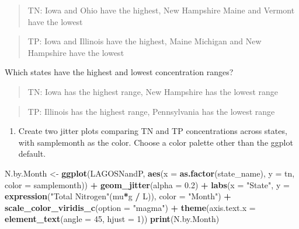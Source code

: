 \documentclass[]{article}
\newenvironment{Shaded}{\begin{snugshade}}{\end{snugshade}}
\newcommand{\DataTypeTok}[1]{\textcolor[rgb]{0.13,0.29,0.53}{#1}}
\newcommand{\DecValTok}[1]{\textcolor[rgb]{0.00,0.00,0.81}{#1}}
\newcommand{\FloatTok}[1]{\textcolor[rgb]{0.00,0.00,0.81}{#1}}
\newcommand{\KeywordTok}[1]{\textcolor[rgb]{0.13,0.29,0.53}{\textbf{#1}}}
\newcommand{\NormalTok}[1]{#1}
\newcommand{\OperatorTok}[1]{\textcolor[rgb]{0.81,0.36,0.00}{\textbf{#1}}}
\newcommand{\StringTok}[1]{\textcolor[rgb]{0.31,0.60,0.02}{#1}}
\providecommand{\tightlist}{%
  \setlength{\itemsep}{0pt}\setlength{\parskip}{0pt}}
\begin{document}
\begin{quote}
TN: Iowa and Ohio have the highest, New Hampshire Maine and Vermont have
the lowest
\end{quote}

\begin{quote}
TP: Iowa and Illinois have the highest, Maine Michigan and New Hampshire
have the lowest
\end{quote}

Which states have the highest and lowest concentration ranges?

\begin{quote}
TN: Iowa has the highest range, New Hampshire has the lowest range
\end{quote}

\begin{quote}
TP: Illinois has the highest range, Pennsylvania has the lowest range
\end{quote}

\begin{enumerate}
\def\labelenumi{\arabic{enumi}.}
\setcounter{enumi}{9}
\tightlist
\item
  Create two jitter plots comparing TN and TP concentrations across
  states, with samplemonth as the color. Choose a color palette other
  than the ggplot default.
\end{enumerate}

\begin{Shaded}
\begin{Highlighting}[]
\NormalTok{N.by.Month <-}\StringTok{  }
\KeywordTok{ggplot}\NormalTok{(LAGOSNandP, }
       \KeywordTok{aes}\NormalTok{(}\DataTypeTok{x =} \KeywordTok{as.factor}\NormalTok{(state_name), }\DataTypeTok{y =}\NormalTok{ tn, }\DataTypeTok{color =}\NormalTok{ samplemonth)) }\OperatorTok{+}
\StringTok{  }\KeywordTok{geom_jitter}\NormalTok{(}\DataTypeTok{alpha =} \FloatTok{0.2}\NormalTok{) }\OperatorTok{+}\StringTok{ }
\StringTok{  }\KeywordTok{labs}\NormalTok{(}\DataTypeTok{x =} \StringTok{"State"}\NormalTok{, }\DataTypeTok{y =} \KeywordTok{expression}\NormalTok{(}\StringTok{"Total Nitrogen"}\NormalTok{(mu}\OperatorTok{*}\NormalTok{g }\OperatorTok{/}\StringTok{ }\NormalTok{L)), }\DataTypeTok{color =} \StringTok{"Month"}\NormalTok{) }\OperatorTok{+}
\StringTok{  }\KeywordTok{scale_color_viridis_c}\NormalTok{(}\DataTypeTok{option =} \StringTok{"magma"}\NormalTok{) }\OperatorTok{+}
\StringTok{  }\KeywordTok{theme}\NormalTok{(}\DataTypeTok{axis.text.x =} \KeywordTok{element_text}\NormalTok{(}\DataTypeTok{angle =} \DecValTok{45}\NormalTok{, }\DataTypeTok{hjust =} \DecValTok{1}\NormalTok{))}
\KeywordTok{print}\NormalTok{(N.by.Month)}
\end{Highlighting}
\end{Shaded}
\end{document}
